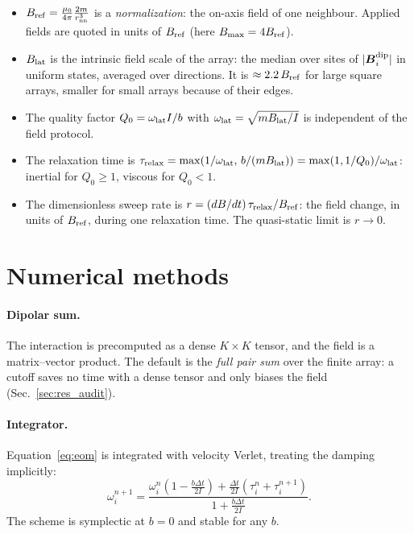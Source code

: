 \documentclass[11pt,a4paper]{article}
\newcommand{\vect}[1]{\boldsymbol{#1}}
\begin{document}
\begin{itemize}[leftmargin=*]
\item $B_{\rm ref}=\frac{\mu_0}{4\pi}\frac{2m}{r_{\rm nn}^3}$ is a \emph{normalization}: the on-axis field of one neighbour. Applied fields are quoted in units of $B_{\rm ref}$ (here $B_{\max}=4B_{\rm ref}$).
\item $B_{\rm lat}$ is the intrinsic field scale of the array: the median over sites of $|\vect B_i^{\rm dip}|$ in uniform states, averaged over directions. It is $\approx2.2\,B_{\rm ref}$ for large square arrays, smaller for small arrays because of their edges.
\item The quality factor $Q_0=\omega_{\rm lat}I/b$ with $\omega_{\rm lat}=\sqrt{mB_{\rm lat}/I}$ is independent of the field protocol.
\item The relaxation time is $\tau_{\rm relax}=\max(1/\omega_{\rm lat},\,b/(mB_{\rm lat}))=\max(1,1/Q_0)/\omega_{\rm lat}$: inertial for $Q_0\ge1$, viscous for $Q_0<1$.
\item The dimensionless sweep rate is $r=(dB/dt)\,\tau_{\rm relax}/B_{\rm ref}$: the field change, in units of $B_{\rm ref}$, during one relaxation time. The quasi-static limit is $r\to0$.
\end{itemize}

\section{Numerical methods}
\label{sec:methods}

\paragraph{Dipolar sum.} The interaction is precomputed as a dense $K\times K$ tensor, and the field is a matrix--vector product. The default is the \emph{full pair sum} over the finite array: a cutoff saves no time with a dense tensor and only biases the field (Sec.~\ref{sec:res_audit}).

\paragraph{Integrator.} Equation~\eqref{eq:eom} is integrated with velocity Verlet, treating the damping implicitly:
\begin{equation}
\omega_i^{n+1}=\frac{\omega_i^{n}\left(1-\frac{b\Delta t}{2I}\right)+\frac{\Delta t}{2I}\left(\tau_i^{n}+\tau_i^{n+1}\right)}{1+\frac{b\Delta t}{2I}} .
\end{equation}
The scheme is symplectic at $b=0$ and stable for any $b$.
\end{document}
